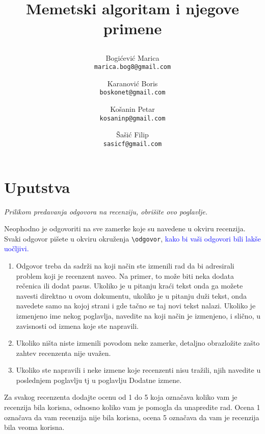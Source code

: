 \documentclass[a4paper]{report}
\newcommand{\odgovor}[1]{\textcolor{blue}{#1}}
\begin{document}
\title{Memetski algoritam i njegove primene\\ \small{
\author{
  Bogićević Marica\\
  \texttt{marica.bog8@gmail.com}
  \and
  Karanović Boris\\
  \texttt{boskonet@gmail.com}
    \and
  Košanin Petar\\
  \texttt{kosaninp@gmail.com}
    \and
  Šašić Filip\\
  \texttt{sasicf@gmail.com}
}}}

\maketitle


\tableofcontents
\chapter{Uputstva}
\emph{Prilikom predavanja odgovora na recenziju, obrišite ovo poglavlje.}

Neophodno je odgovoriti na sve zamerke koje su navedene u okviru recenzija. Svaki odgovor pišete u okviru okruženja \verb"\odgovor", \odgovor{kako bi vaši odgovori bili lakše
 uočljivi.} 
\begin{enumerate}

\item Odgovor treba da sadrži na koji način ste izmenili rad da bi adresirali problem koji je recenzent naveo. Na primer, to može biti neka dodata rečenica ili dodat pasus. 
Ukoliko je u pitanju kraći tekst onda ga možete navesti direktno u ovom dokumentu, ukoliko je u pitanju duži tekst, onda navedete samo na kojoj strani i gde tačno se taj novi 
tekst nalazi. Ukoliko je izmenjeno ime nekog poglavlja, navedite na koji način je izmenjeno, i slično, u zavisnosti od izmena koje ste napravili. 

\item Ukoliko ništa niste izmenili povodom neke zamerke, detaljno obrazložite zašto zahtev recenzenta nije uvažen.

\item Ukoliko ste napravili i neke izmene koje recenzenti nisu tražili, njih navedite u poslednjem poglavlju tj u poglavlju Dodatne izmene.
\end{enumerate}

Za svakog recenzenta dodajte ocenu od 1 do 5 koja označava koliko vam je recenzija bila korisna, odnosno koliko vam je pomogla da unapredite rad. Ocena 1 označava da vam 
recenzija nije bila korisna, ocena 5 označava da vam je recenzija bila veoma korisna. 
\end{document}
